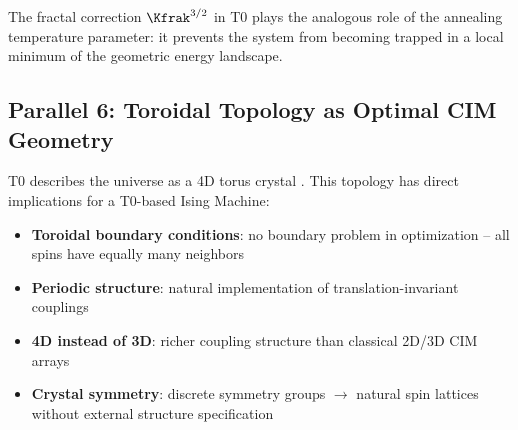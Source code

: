 \begin{table}[h]
    \centering
    \caption{Parallel 5: Fractal correction and annealing}
    \label{tab:parallel5}
\end{table}

The fractal correction $\Kfrak^{3/2}$ in T0 plays the analogous role of the
annealing temperature parameter: it prevents the system from becoming trapped in
a local minimum of the geometric energy landscape.

\subsection{Parallel 6: Toroidal Topology as Optimal CIM Geometry}

T0 describes the universe as a 4D torus crystal \cite{pascher_torus_2025}.
This topology has direct implications for a T0-based Ising Machine:

\begin{itemize}
    \item \textbf{Toroidal boundary conditions}: no boundary problem in optimization --
    all spins have equally many neighbors
    \item \textbf{Periodic structure}: natural implementation of translation-invariant
    couplings
    \item \textbf{4D instead of 3D}: richer coupling structure than classical 2D/3D
    CIM arrays
    \item \textbf{Crystal symmetry}: discrete symmetry groups $\rightarrow$ natural
    spin lattices without external structure specification
\end{itemize}

